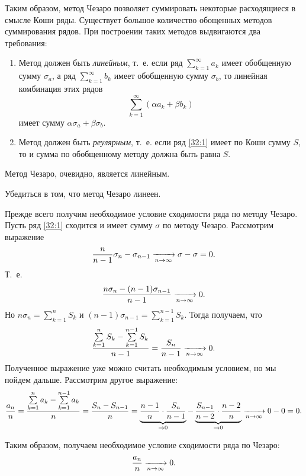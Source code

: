 \documentclass[../../main.tex]{subfiles}
\begin{document}
Таким образом, метод Чезаро позволяет суммировать некоторые расходящиеся в 
смысле Коши ряды. Существует большое количество обощенных методов суммирования 
рядов. При построении таких методов выдвигаются два требования:
\begin{enumerate}
 \item Метод должен быть \emph{линейным}, т.~е. если ряд 
 $\sum\limits_{k=1}^\infty a_k$ имеет обобщенную сумму $\sigma_a$, а ряд 
 $\sum\limits_{k=1}^\infty b_k$ имеет обобщенную сумму $\sigma_b$, то линейная 
 комбинация этих рядов \[\sum\limits_{k=1}^\infty (\alpha a_k + \beta b_k)\] 
 имеет сумму $\alpha\sigma_a + \beta\sigma_b$.
 \item Метод должен быть \emph{реулярным}, т.~е. если ряд \eqref{32:1} имеет 
 по Коши сумму $S$, то и сумма по обобщенному методу должна быть равна $S$.
\end{enumerate}

Метод Чезаро, очевидно, является линейным.

\begin{exc}
 Убедиться в том, что метод Чезаро линеен.
\end{exc}

Прежде всего получим необходимое условие сходимости ряда по методу Чезаро. 
Пусть ряд \eqref{32:1} сходится и имеет сумму $\sigma$ по методу Чезаро. 
Рассмотрим выражение
\[\frac{n}{n-1}\sigma_n - \sigma_{n-1} \xrightarrow[n\to\infty]{} \sigma - \sigma = 
0.\] Т.~е. \[\frac{n\sigma_n - (n-1)\sigma_{n-1}}{n-1} \xrightarrow[n\to\infty]{} 0.\] 
Но $n\sigma_n = \sum\limits_{k=1}^n S_k$ и $(n-1)\sigma_{n-1} = 
\sum\limits_{k=1}^{n-1} S_k$. Тогда получаем, что
\[\frac{\sum\limits_{k=1}^n S_k - \sum\limits_{k=1}^{n-1} S_k}{n-1} = 
\frac{S_n}{n-1} \xrightarrow[n\to\infty]{} 0.\]
Полученное выражение уже можно считать необходимым условием, но мы пойдем 
дальше. Рассмотрим другое выражение: \[\frac{a_n}n = \frac{\sum\limits_{k=1}^n 
a_k - \sum\limits_{k=1}^{n-1} a_k}n = \frac{S_n - S_{n-1}}n  = 
\underbrace{\frac{n-1}n\cdot\frac{S_n}{n-1}}_{\to0} - 
\underbrace{\frac{S_{n-1}}{n-2}\cdot\frac{n-2}n}_{\to0} \xrightarrow[n\to\infty]{} 0-0 
= 0.\]

Таким образом, получаем необходимое условие сходимости ряда по Чезаро: 
\[\frac{a_n}n \xrightarrow[n\to\infty]{} 0.\]
\end{document}
